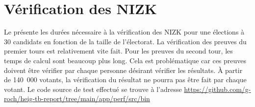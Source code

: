 \documentclass[../report]{subfiles}
\begin{document}
\section{Vérification des NIZK}

Le  présente les durées nécessaire à la vérification des NIZK pour une élections à 30 candidats en fonction 
de la taille de l'électorat.
La vérification des preuves du premier tours est relativement vite fait.
Pour les preuves du second tour, les temps de calcul sont beaucoup plus long.
Cela est problématique car ces preuves doivent être vérifier par chaque personne désirant vérifier les résultats.
À partir de 140~000 votants, la vérification du résultat ne pourra pas être fait par chaque votant.
Le code source de test effectué se trouve à l'adresse \url{https://github.com/g-roch/heig-tb-report/tree/main/app/perf/src/bin}
\end{document}
